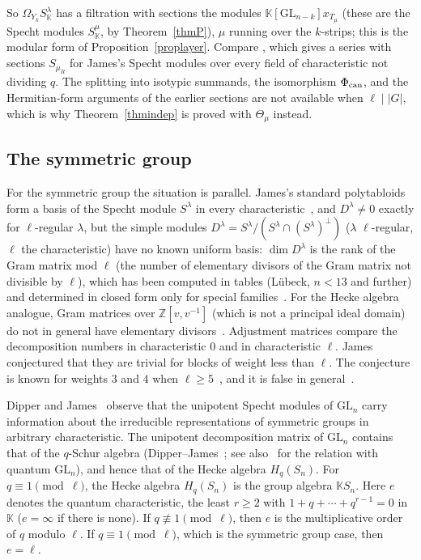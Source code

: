 \documentclass[11pt, letterpaper]{amsart}
\theoremstyle{definition}
\theoremstyle{remark}
\newcommand{\KK}{\mathbb{K}}
\newcommand{\ZZ}{\mathbb{Z}}
\newcommand{\GL}{\mathrm{GL}}
\begin{document}
So $\Omega_{Y_k}S^\lambda_\KK$ has a filtration with sections the modules $\KK[\GL_{n-k}]x_{T_\mu}$ (these are the Specht modules $S^\mu_\KK$, by Theorem~\ref{thmP}), $\mu$ running over the $k$-strips; this is the modular form of Proposition~\ref{proplayer}. Compare \cite[Thm.~16.9]{James84}, which gives a series with sections $S_{\mu_R}$ for James's Specht modules over every field of characteristic not dividing $q$. The splitting into isotypic summands, the isomorphism $\Phi_{\rm can}$, and the Hermitian-form arguments of the earlier sections are not available when $\ell\mid|G|$, which is why Theorem~\ref{thmindep} is proved with $\Theta_\mu$ instead.

\subsection{The symmetric group}\label{subsym}

For the symmetric group the situation is parallel. James's standard polytabloids form a basis of the Specht module $S^\lambda$ in every characteristic~\cite{James78}, and $D^\lambda\ne0$ exactly for $\ell$-regular $\lambda$, but the simple modules $D^\lambda=S^\lambda/(S^\lambda\cap(S^\lambda)^\perp)$ ($\lambda$ $\ell$-regular, $\ell$ the characteristic) have no known uniform basis: $\dim D^\lambda$ is the rank of the Gram matrix mod $\ell$ (the number of elementary divisors of the Gram matrix not divisible by $\ell$), which has been computed in tables (L\"ubeck, $n<13$ and further) and determined in closed form only for special families~\cite{Lubeck,KM,KN}. For the Hecke algebra analogue, Gram matrices over $\ZZ[v,v^{-1}]$ (which is not a principal ideal domain) do not in general have elementary divisors~\cite{KM}. Adjustment matrices compare the decomposition numbers in characteristic $0$ and in characteristic $\ell$. James conjectured that they are trivial for blocks of weight less than $\ell$. The conjecture is known for weights $3$ and $4$ when $\ell\ge5$~\cite{Fayers,FayersFour,Low}, and it is false in general~\cite{Williamson}.

Dipper and James~\cite{DJ} observe that the unipotent Specht modules of $\GL_n$ carry information about the irreducible representations of symmetric groups in arbitrary characteristic. The unipotent decomposition matrix of $\GL_n$ contains that of the $q$-Schur algebra (Dipper--James~\cite{DJ89}; see also~\cite{BDK} for the relation with quantum $\GL_n$), and hence that of the Hecke algebra $H_q(S_n)$. For $q\equiv1\pmod\ell$, the Hecke algebra $H_q(S_n)$ is the group algebra $\KK S_n$. Here $e$ denotes the quantum characteristic, the least $r\ge2$ with $1+q+\cdots+q^{r-1}=0$ in $\KK$ ($e=\infty$ if there is none). If $q\not\equiv1\pmod\ell$, then $e$ is the multiplicative order of $q$ modulo $\ell$. If $q\equiv1\pmod\ell$, which is the symmetric group case, then $e=\ell$.
\end{document}
